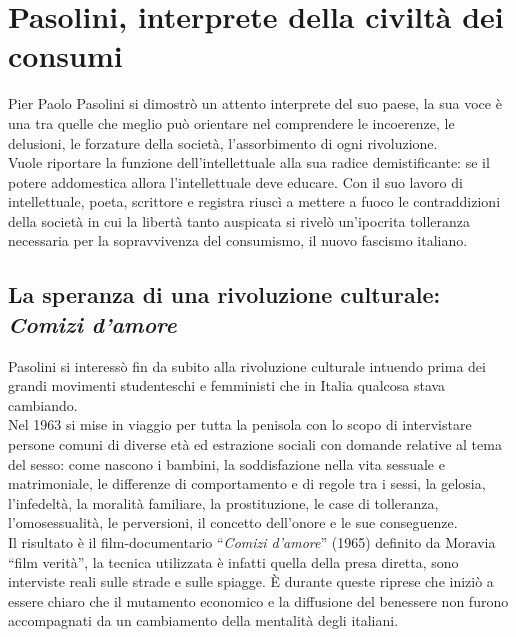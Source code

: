 \section{Pasolini, interprete della civiltà dei consumi}
Pier Paolo Pasolini si dimostrò un attento interprete del suo paese, la sua voce è una tra quelle che meglio può orientare nel comprendere le incoerenze, le delusioni, le forzature della società, l'assorbimento di ogni rivoluzione.
\\Vuole riportare la funzione dell'intellettuale alla sua radice demistificante: se il potere addomestica allora l'intellettuale deve educare.
Con il suo lavoro di intellettuale, poeta, scrittore e registra riuscì a mettere a fuoco le contraddizioni della società in cui la libertà tanto auspicata si rivelò un'ipocrita tolleranza necessaria per la sopravvivenza del consumismo, il nuovo fascismo italiano.


\subsection{La speranza di una rivoluzione culturale: 
\\ \textbf{\textit{Comizi d'amore}}}
Pasolini si interessò fin da subito alla rivoluzione culturale intuendo prima dei grandi movimenti studenteschi e femministi che in Italia qualcosa stava cambiando.
\\Nel 1963 si mise in viaggio per tutta la penisola con lo scopo di intervistare persone comuni di diverse età ed estrazione sociali con domande relative al tema del sesso: come nascono i bambini, la soddisfazione nella vita sessuale e matrimoniale, le differenze di comportamento e di regole tra i sessi, la gelosia, l’infedeltà, la moralità familiare, la prostituzione, le case di tolleranza, l’omosessualità, le perversioni, il concetto dell'onore e le sue conseguenze.
\\Il risultato è il film-documentario \enquote{\textit{Comizi d'amore}} (1965) definito da Moravia \enquote{film verità}, la tecnica utilizzata è infatti quella della presa diretta, sono interviste reali sulle strade e sulle spiagge.
È durante queste riprese che iniziò a essere chiaro che il mutamento economico e la diffusione del benessere non furono accompagnati da un cambiamento della mentalità degli italiani.

